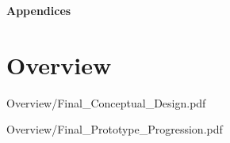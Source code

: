 \documentclass[a4 paper, 12pt]{article}
\begin{document}
\pagebreak
\begin{center}
    \Huge \textbf{Appendices}
    \section{Overview}
\end{center}


    \pagebreak     
    
                    {Overview/Final_Conceptual_Design.pdf}
                    \label{sec:D.1}

    \pagebreak     
    
                    {Overview/Final_Prototype_Progression.pdf}
                    \label{sec:D.2}
                    \pagebreak
\end{document}
